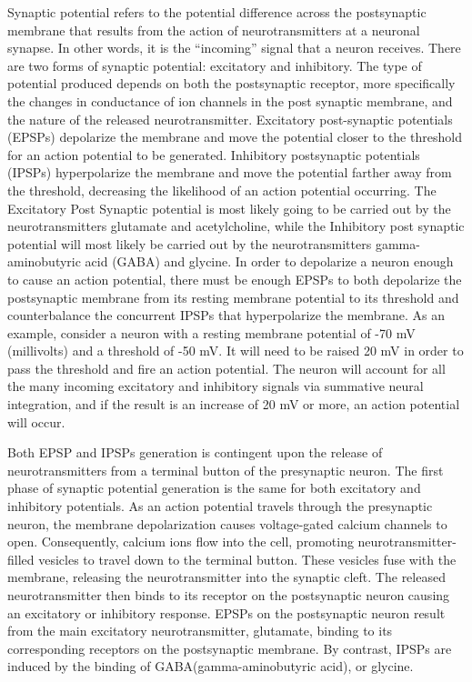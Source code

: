 Synaptic potential refers to the potential difference across the postsynaptic membrane that results from the action of neurotransmitters at a neuronal synapse. In other words, it is the ``incoming'' signal that a neuron receives. There are two forms of synaptic potential: excitatory and inhibitory. The type of potential produced depends on both the postsynaptic receptor, more specifically the changes in conductance of ion channels in the post synaptic membrane, and the nature of the released neurotransmitter. Excitatory post-synaptic potentials (EPSPs) depolarize the membrane and move the potential closer to the threshold for an action potential to be generated. Inhibitory postsynaptic potentials (IPSPs) hyperpolarize the membrane and move the potential farther away from the threshold, decreasing the likelihood of an action potential occurring. The Excitatory Post Synaptic potential is most likely going to be carried out by the neurotransmitters glutamate and acetylcholine, while the Inhibitory post synaptic potential will most likely be carried out by the neurotransmitters gamma-aminobutyric acid (GABA) and glycine. In order to depolarize a neuron enough to cause an action potential, there must be enough EPSPs to both depolarize the postsynaptic membrane from its resting membrane potential to its threshold and counterbalance the concurrent IPSPs that hyperpolarize the membrane. As an example, consider a neuron with a resting membrane potential of -70 mV (millivolts) and a threshold of -50 mV. It will need to be raised 20 mV in order to pass the threshold and fire an action potential. The neuron will account for all the many incoming excitatory and inhibitory signals via summative neural integration, and if the result is an increase of 20 mV or more, an action potential will occur.

Both EPSP and IPSPs generation is contingent upon the release of neurotransmitters from a terminal button of the presynaptic neuron. The first phase of synaptic potential generation is the same for both excitatory and inhibitory potentials. As an action potential travels through the presynaptic neuron, the membrane depolarization causes voltage-gated calcium channels to open. Consequently, calcium ions flow into the cell, promoting neurotransmitter-filled vesicles to travel down to the terminal button. These vesicles fuse with the membrane, releasing the neurotransmitter into the synaptic cleft. The released neurotransmitter then binds to its receptor on the postsynaptic neuron causing an excitatory or inhibitory response. EPSPs on the postsynaptic neuron result from the main excitatory neurotransmitter, glutamate, binding to its corresponding receptors on the postsynaptic membrane. By contrast, IPSPs are induced by the binding of GABA(gamma-aminobutyric acid), or glycine.


